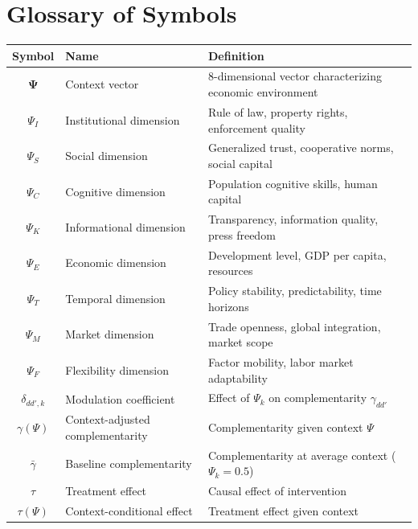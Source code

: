 
\section{Glossary of Symbols}
\label{sec:V-glossary}

\begin{longtable}{@{}clp{7cm}@{}}
\toprule
\textbf{Symbol} & \textbf{Name} & \textbf{Definition} \\
\midrule
\endhead
$\boldsymbol{\Psi}$ & Context vector & 8-dimensional vector characterizing economic environment \\
$\Psi_I$ & Institutional dimension & Rule of law, property rights, enforcement quality \\
$\Psi_S$ & Social dimension & Generalized trust, cooperative norms, social capital \\
$\Psi_C$ & Cognitive dimension & Population cognitive skills, human capital \\
$\Psi_K$ & Informational dimension & Transparency, information quality, press freedom \\
$\Psi_E$ & Economic dimension & Development level, GDP per capita, resources \\
$\Psi_T$ & Temporal dimension & Policy stability, predictability, time horizons \\
$\Psi_M$ & Market dimension & Trade openness, global integration, market scope \\
$\Psi_F$ & Flexibility dimension & Factor mobility, labor market adaptability \\
\midrule
$\delta_{dd',k}$ & Modulation coefficient & Effect of $\Psi_k$ on complementarity $\gamma_{dd'}$ \\
$\gamma(\Psi)$ & Context-adjusted complementarity & Complementarity given context $\Psi$ \\
$\bar{\gamma}$ & Baseline complementarity & Complementarity at average context ($\Psi_k = 0.5$) \\
\midrule
$\tau$ & Treatment effect & Causal effect of intervention \\
$\tau(\Psi)$ & Context-conditional effect & Treatment effect given context \\
\bottomrule
\end{longtable}


